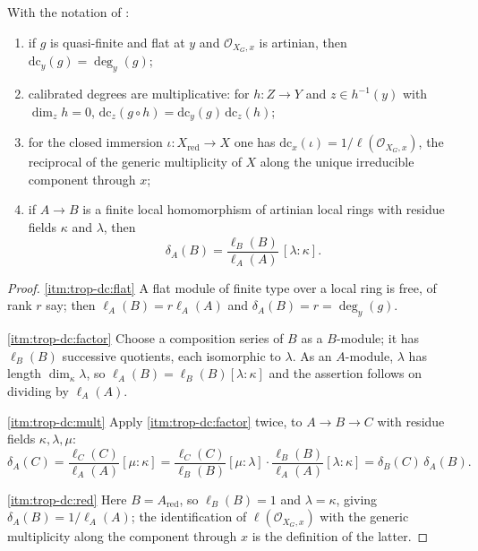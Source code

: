 \begin{proposition}
\label{prop:trop-calibrated-degree}
With the notation of :
\begin{enumerate}
\item\label{itm:trop-dc:flat} if $g$ is quasi-finite and flat at $y$ and
  $\mathcal O_{X_G,x}$ is artinian, then
  $\mathrm{dc}_y(g)=\deg_y(g)$;
\item\label{itm:trop-dc:mult} calibrated degrees are multiplicative: for
  $h:Z\to Y$ and $z\in h^{-1}(y)$ with $\dim_zh=0$,
  $\mathrm{dc}_z(g\circ h)=\mathrm{dc}_y(g)\,\mathrm{dc}_z(h)$;
\item\label{itm:trop-dc:red} for the closed immersion
  $\iota:X_{\mathrm{red}}\to X$ one has
  $\mathrm{dc}_x(\iota)=1/\ell(\mathcal O_{X_G,x})$, the reciprocal of the
  generic multiplicity of $X$ along the unique irreducible component through
  $x$;
\item\label{itm:trop-dc:factor} if $A\to B$ is a finite local homomorphism
  of artinian local rings with residue fields $\kappa$ and $\lambda$, then
  \[
   \delta_A(B)=\frac{\ell_B(B)}{\ell_A(A)}\,[\lambda:\kappa].
  \]
\end{enumerate}
\end{proposition}

\begin{proof}
\cref{itm:trop-dc:flat} A flat module of finite type over a local ring is
free, of rank $r$ say; then $\ell_A(B)=r\ell_A(A)$ and
$\delta_A(B)=r=\deg_y(g)$.

\cref{itm:trop-dc:factor} Choose a composition series of $B$ as a
$B$-module; it has $\ell_B(B)$ successive quotients, each isomorphic to
$\lambda$. As an $A$-module, $\lambda$ has length $\dim_\kappa\lambda$, so
$\ell_A(B)=\ell_B(B)[\lambda:\kappa]$ and the assertion follows on dividing
by $\ell_A(A)$.

\cref{itm:trop-dc:mult} Apply \cref{itm:trop-dc:factor} twice, to
$A\to B\to C$ with residue fields $\kappa,\lambda,\mu$:
\[
 \delta_A(C)=\frac{\ell_C(C)}{\ell_A(A)}[\mu:\kappa]
 =\frac{\ell_C(C)}{\ell_B(B)}[\mu:\lambda]\cdot
  \frac{\ell_B(B)}{\ell_A(A)}[\lambda:\kappa]
 =\delta_B(C)\,\delta_A(B).
\]

\cref{itm:trop-dc:red} Here $B=A_{\mathrm{red}}$, so $\ell_B(B)=1$ and
$\lambda=\kappa$, giving $\delta_A(B)=1/\ell_A(A)$; the identification of
$\ell(\mathcal O_{X_G,x})$ with the generic multiplicity along the component
through $x$ is the definition of the latter.
\end{proof}

